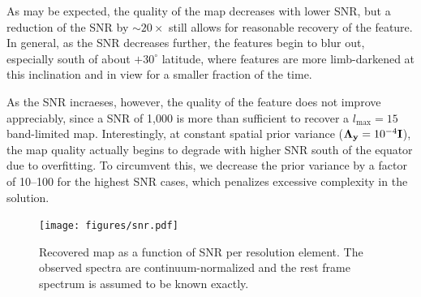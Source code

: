 \documentclass[modern]{aastex631}
\begin{document}
As may be expected, the quality of the map decreases with lower SNR, but a reduction of the SNR by $\sim 20\times$ still allows for reasonable recovery of the \spot feature. 
In general, as the SNR decreases further, the features begin to blur out, especially south of about $+30^\circ$ latitude, where features are more limb-darkened at this inclination and in view for a smaller fraction of the time.

As the SNR incraeses, however, the quality of the \spot feature does not improve appreciably, since a SNR of 1,000 is more than sufficient to recover a $l_\mathrm{max} = 15$ band-limited map. 
Interestingly, at constant spatial prior variance ($\boldsymbol{\Lambda}_{\mathbf{y}} = 10^{-4}{\mathbf{I}}$), the map quality actually begins to degrade with higher SNR south of the equator due to overfitting.
To circumvent this, we decrease the prior variance by a factor of 10--100 for the highest SNR cases, which penalizes excessive complexity in the solution.

%
\begin{figure}[t!]
    \begin{centering}
        \texttt{[image: figures/snr.pdf]}
        \caption{%
            Recovered \spot map as a function of SNR per resolution element. The observed spectra are continuum-normalized and the rest frame spectrum is assumed to be known exactly.
        }
        \label{fig:snr}
    \end{centering}
\end{figure}
\end{document}
